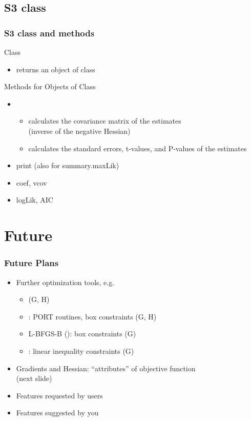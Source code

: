 \documentclass{beamer}
\begin{document}
\subsection{S3 class}
\begin{frame}
\frametitle{S3 class and methods}
Class
\begin{itemize}
\item {} returns an object of class 
\end{itemize}
\vspace*{2ex}
Methods for Objects of Class 
\begin{itemize}
\item {}
   \begin{itemize}
   \item calculates the covariance matrix of the estimates\\
      (inverse of the negative Hessian)
   \item calculates the standard errors, t-values, and P-values of the estimates
   \end{itemize}
\item print (also for summary.maxLik)
\item coef, vcov
\item logLik, AIC
\end{itemize}
\end{frame}


\section{Future}
\begin{frame}
\frametitle{Future Plans}
\begin{itemize}
\item Further optimization tools, e.g.
   \begin{itemize}
   \item {} (G, H)
   \item {}: PORT routines, box constraints (G, H)
   \item L-BFGS-B (): box constraints (G)
   \item {}: linear inequality constraints (G)
   \end{itemize}
\item Gradients and Hessian: ``attributes'' of objective function\\
   (next slide)
\item Features requested by users
\item Features suggested by you
\end{itemize}
\end{frame}
\end{document}
